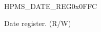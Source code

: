 \begin{register}{H}{PMS\_DATE\_REG}{0x0FFC}\label{regdesc:PMSDATEREG}
%
%
\regnewline%
\begin{regdesc}\begin{reglist}
\label{fielddesc:PMSDATE}\item [PMS\_DATE] Date register. (R/W)
\end{reglist}\end{regdesc}
\end{register}
